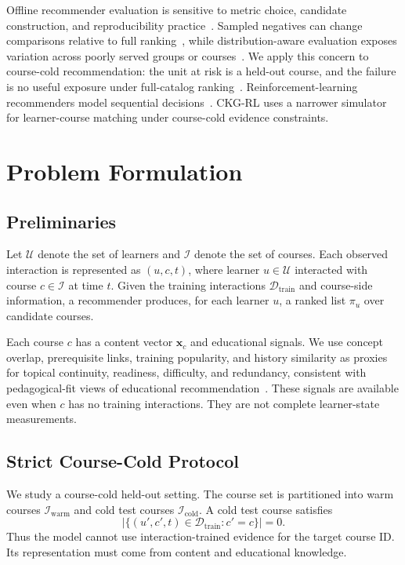 \documentclass[letterpaper]{article}
\begin{document}
Offline recommender evaluation is sensitive to metric choice, candidate construction, and reproducibility practice~\cite{sun2020rigorous,hidasi2023flaws,bauer2024landscape}. Sampled negatives can change comparisons relative to full ranking~\cite{krichene2020sampled,li2024itemsampling}, while distribution-aware evaluation exposes variation across poorly served groups or courses~\cite{ekstrand2024distributional}. We apply this concern to course-cold recommendation: the unit at risk is a held-out course, and the failure is no useful exposure under full-catalog ranking~\cite{takehi2025diversification}. Reinforcement-learning recommenders model sequential decisions~\cite{shani2005mdp,zhao2018deepreinforcement,chen2023rlrecsurvey}. CKG-RL uses a narrower simulator for learner-course matching under course-cold evidence constraints.

\section{Problem Formulation}

\subsection{Preliminaries}
Let \(\mathcal{U}\) denote the set of learners and \(\mathcal{I}\) denote the set of courses. Each observed interaction is represented as \((u,c,t)\), where learner \(u \in \mathcal{U}\) interacted with course \(c \in \mathcal{I}\) at time \(t\). Given the training interactions \(\mathcal{D}_{\mathrm{train}}\) and course-side information, a recommender produces, for each learner \(u\), a ranked list \(\pi_u\) over candidate courses.

Each course \(c\) has a content vector \(\mathbf{x}_c\) and educational signals. We use concept overlap, prerequisite links, training popularity, and history similarity as proxies for topical continuity, readiness, difficulty, and redundancy, consistent with pedagogical-fit views of educational recommendation~\cite{dasilva2023educationalrs,rahayu2023learningpath}. These signals are available even when \(c\) has no training interactions. They are not complete learner-state measurements.

\subsection{Strict Course-Cold Protocol}
We study a course-cold held-out setting. The course set is partitioned into warm courses \(\mathcal{I}_{\mathrm{warm}}\) and cold test courses \(\mathcal{I}_{\mathrm{cold}}\). A cold test course satisfies
\begin{equation}
|\{(u',c',t)\in \mathcal{D}_{\mathrm{train}}: c'=c\}|=0.
\end{equation}
Thus the model cannot use interaction-trained evidence for the target course ID. Its representation must come from content and educational knowledge.
\end{document}
